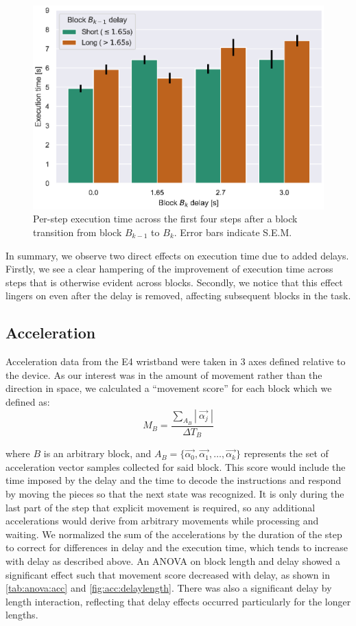 \begin{figure}[h]
  \centering
  \includegraphics[width=.8\textwidth]{publications/2021ImpactDelayedResponse/Fig8.eps}
  \caption{Per-step execution time across the first four steps after a block transition from block \( B_{k-1} \) to \( B_k \). Error bars indicate S.E.M.}\label{fig:exectime:transition}%
\end{figure}

In summary, we observe two direct effects on execution time due to added delays.
Firstly, we see a clear hampering of the improvement of execution time across steps that is otherwise evident across blocks.
Secondly, we notice that this effect lingers on even after the delay is removed, affecting subsequent blocks in the task.

\subsection{Acceleration}

Acceleration data from the E4 wristband were taken in 3 axes defined relative to the device.
As our interest was in the amount of movement rather than the direction in space, we calculated a ``movement score'' for each block which we defined as:
\begin{equation}
    M_B = \frac{ \sum_{A_B} |\: \overrightarrow{\alpha_j} \:| }{\Delta T_{B}}
\end{equation}

where \( B \) is an arbitrary block, and \(A_{B} = \{ \overrightarrow{\alpha_0}, \overrightarrow{\alpha_1}, \ldots, \overrightarrow{\alpha_k} \} \) represents the set of acceleration vector samples collected for said block.
This score would include the time imposed by the delay and the time to decode the instructions and respond by moving the pieces so that the next state was recognized.
It is only during the last part of the step that explicit movement is required, so any additional accelerations would derive from arbitrary movements while processing and waiting.
We normalized the sum of the accelerations by the duration of the step to correct for differences in delay and the execution time, which tends to increase with delay as described above.
An ANOVA on block length and delay showed a significant effect such that movement score decreased with delay, as shown in \cref{tab:anova:acc} and \cref{fig:acc:delaylength}.
There was also a significant delay by length interaction, reflecting that delay effects occurred particularly for the longer lengths.

